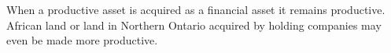 When  a productive asset is acquired as a financial asset it remains productive. African land or land in Northern Ontario acquired by holding companies may even be made more productive. 


